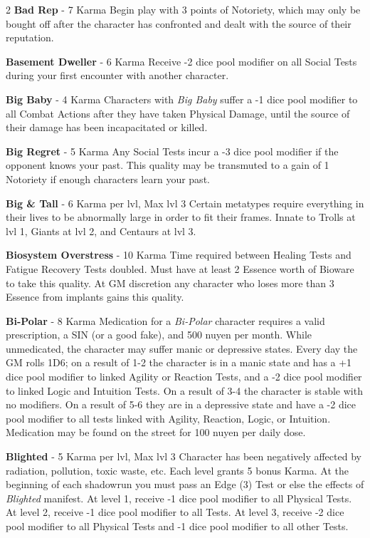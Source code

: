 \documentclass[
  oneside]{article}
\begin{document}
\begin{multicols}{2}
\textbf{Bad Rep} - 7 Karma Begin play with 3
points of Notoriety, which may only be bought off
after the character has confronted and dealt with
the source of their reputation.

\textbf{Basement Dweller} - 6 Karma Receive -2
dice pool modifier on all Social Tests during your
first encounter with another character.

\textbf{Big Baby} - 4 Karma Characters with
\emph{Big Baby} suffer a -1 dice pool modifier to
all Combat Actions after they have taken Physical
Damage, until the source of their damage has been
incapacitated or killed.

\textbf{Big Regret} - 5 Karma Any Social Tests
incur a -3 dice pool modifier if the opponent
knows your past. This quality may be transmuted to
a gain of 1 Notoriety if enough characters learn
your past.

\textbf{Big \& Tall} - 6 Karma per lvl, Max lvl 3
Certain metatypes require everything in their
lives to be abnormally large in order to fit their
frames. Innate to Trolls at lvl 1, Giants at lvl
2, and Centaurs at lvl 3.

\textbf{Biosystem Overstress} - 10 Karma Time
required between Healing Tests and Fatigue
Recovery Tests doubled. Must have at least 2
Essence worth of Bioware to take this quality. At
GM discretion any character who loses more than 3
Essence from implants gains this quality.

\textbf{Bi-Polar} - 8 Karma Medication for a
\emph{Bi-Polar} character requires a valid
prescription, a SIN (or a good fake), and 500
nuyen per month. While unmedicated, the character
may suffer manic or depressive states. Every day
the GM rolls 1D6; on a result of 1-2 the character
is in a manic state and has a +1 dice pool
modifier to linked Agility or Reaction Tests, and
a -2 dice pool modifier to linked Logic and
Intuition Tests. On a result of 3-4 the character
is stable with no modifiers. On a result of 5-6
they are in a depressive state and have a -2 dice
pool modifier to all tests linked with Agility,
Reaction, Logic, or Intuition. Medication may be
found on the street for 100 nuyen per daily dose.

\textbf{Blighted} - 5 Karma per lvl, Max lvl 3
Character has been negatively affected by
radiation, pollution, toxic waste, etc. Each level
grants 5 bonus Karma. At the beginning of each
shadowrun you must pass an Edge (3) Test or else
the effects of \emph{Blighted} manifest. At level
1, receive -1 dice pool modifier to all Physical
Tests. At level 2, receive -1 dice pool modifier
to all Tests. At level 3, receive -2 dice pool
modifier to all Physical Tests and -1 dice pool
modifier to all other Tests.


\end{multicols}
\end{document}
